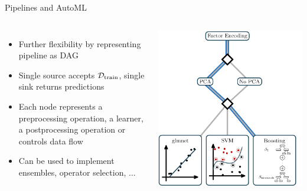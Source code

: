 \documentclass[11pt,compress,t,notes=noshow, xcolor=table]{beamer}
\begin{document}
\begin{vbframe}{Pipelines and AutoML}
\begin{columns}
\begin{itemize}
    \item Further flexibility by representing pipeline as DAG
    \item Single source accepts $\mathcal{D}_{\text{train}}$, single sink returns predictions
    \item Each node represents a preprocessing operation, a learner, a postprocessing operation or controls data flow
    \item Can be used to implement ensembles, operator selection, $\ldots$
\end{itemize}
\begin{center}
\includegraphics[width = \textwidth]{figure_man/pipeline_with_param_table_I.png}
\end{center}
\end{columns}
\end{vbframe}
\end{document}
